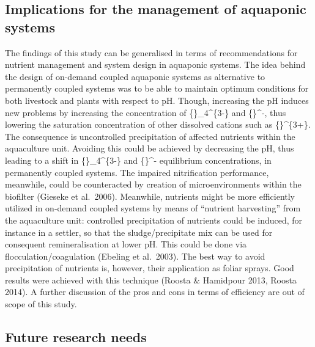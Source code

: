 \documentclass[preprint, 3p,
authoryear]{elsarticle} %
\begin{document}
\hypertarget{implications-for-the-management-of-aquaponic-systems}{%
\subsection{Implications for the management of aquaponic
systems}\label{implications-for-the-management-of-aquaponic-systems}}

The findings of this study can be generalised in terms of
recommendations for nutrient management and system design in aquaponic
systems. The idea behind the design of on-demand coupled aquaponic
systems as alternative to permanently coupled systems was to be able to
maintain optimum conditions for both livestock and plants with respect
to pH. Though, increasing the pH induces new problems by increasing the
concentration of \{\}\_4\^{}\{3-\} and \{\}\^{}-,
thus lowering the saturation concentration of other dissolved cations
such as \{\}\^{}\{3+\}. The consequence is uncontrolled
precipitation of affected nutrients within the aquaculture unit.
Avoiding this could be achieved by decreasing the pH, thus leading to a
shift in \{\}\_4\^{}\{3-\} and \{\}\^{}-
equilibrium concentrations, in permanently coupled systems. The impaired
nitrification performance, meanwhile, could be counteracted by creation
of microenvironments within the biofilter (Gieseke et al.~2006).
Meanwhile, nutrients might be more efficiently utilized in on-demand
coupled systems by means of ``nutrient harvesting'' from the aquaculture
unit: controlled precipitation of nutrients could be induced, for
instance in a settler, so that the sludge/precipitate mix can be used
for consequent remineralisation at lower pH. This could be done via
flocculation/coagulation (Ebeling et al.~2003). The best way to avoid
precipitation of nutrients is, however, their application as foliar
sprays. Good results were achieved with this technique (Roosta \&
Hamidpour 2013, Roosta 2014). A further discussion of the pros and cons
in terms of efficiency are out of scope of this study.

\hypertarget{future-research-needs}{%
\subsection{Future research needs}\label{future-research-needs}}
\end{document}

